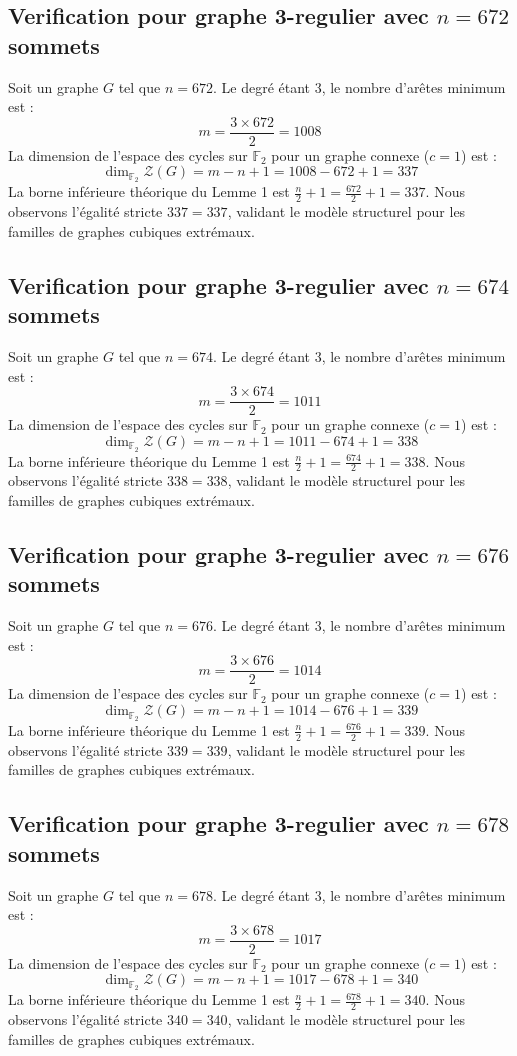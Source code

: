 \documentclass[11pt,a4paper]{article}
\begin{document}
\subsection{Verification pour graphe 3-regulier avec $n=672$ sommets}
Soit un graphe $G$ tel que $n = 672$. Le degré étant 3, le nombre d'arêtes minimum est :
$$ m = \frac{3 \times 672}{2} = 1008 $$
La dimension de l'espace des cycles sur $\mathbb{F}_2$ pour un graphe connexe ($c=1$) est :
$$ \dim_{\mathbb{F}_2} \mathcal{Z}(G) = m - n + 1 = 1008 - 672 + 1 = 337 $$
La borne inférieure théorique du Lemme 1 est $\frac{n}{2} + 1 = \frac{672}{2} + 1 = 337$.
Nous observons l'égalité stricte $337 = 337$, validant le modèle structurel pour les familles de graphes cubiques extrémaux.

\subsection{Verification pour graphe 3-regulier avec $n=674$ sommets}
Soit un graphe $G$ tel que $n = 674$. Le degré étant 3, le nombre d'arêtes minimum est :
$$ m = \frac{3 \times 674}{2} = 1011 $$
La dimension de l'espace des cycles sur $\mathbb{F}_2$ pour un graphe connexe ($c=1$) est :
$$ \dim_{\mathbb{F}_2} \mathcal{Z}(G) = m - n + 1 = 1011 - 674 + 1 = 338 $$
La borne inférieure théorique du Lemme 1 est $\frac{n}{2} + 1 = \frac{674}{2} + 1 = 338$.
Nous observons l'égalité stricte $338 = 338$, validant le modèle structurel pour les familles de graphes cubiques extrémaux.

\subsection{Verification pour graphe 3-regulier avec $n=676$ sommets}
Soit un graphe $G$ tel que $n = 676$. Le degré étant 3, le nombre d'arêtes minimum est :
$$ m = \frac{3 \times 676}{2} = 1014 $$
La dimension de l'espace des cycles sur $\mathbb{F}_2$ pour un graphe connexe ($c=1$) est :
$$ \dim_{\mathbb{F}_2} \mathcal{Z}(G) = m - n + 1 = 1014 - 676 + 1 = 339 $$
La borne inférieure théorique du Lemme 1 est $\frac{n}{2} + 1 = \frac{676}{2} + 1 = 339$.
Nous observons l'égalité stricte $339 = 339$, validant le modèle structurel pour les familles de graphes cubiques extrémaux.

\subsection{Verification pour graphe 3-regulier avec $n=678$ sommets}
Soit un graphe $G$ tel que $n = 678$. Le degré étant 3, le nombre d'arêtes minimum est :
$$ m = \frac{3 \times 678}{2} = 1017 $$
La dimension de l'espace des cycles sur $\mathbb{F}_2$ pour un graphe connexe ($c=1$) est :
$$ \dim_{\mathbb{F}_2} \mathcal{Z}(G) = m - n + 1 = 1017 - 678 + 1 = 340 $$
La borne inférieure théorique du Lemme 1 est $\frac{n}{2} + 1 = \frac{678}{2} + 1 = 340$.
Nous observons l'égalité stricte $340 = 340$, validant le modèle structurel pour les familles de graphes cubiques extrémaux.
\end{document}
